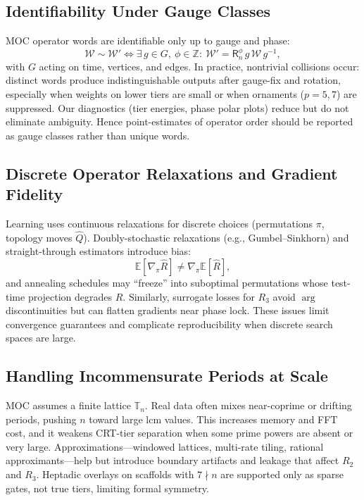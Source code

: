\documentclass[12pt]{article}
\numberwithin{equation}{section}
\theoremstyle{plain}
\theoremstyle{definition}
\theoremstyle{remark}
\begin{document}
\subsection*{Identifiability Under Gauge Classes}
MOC operator words are identifiable only up to gauge and phase:
\[
\mathcal{W}\sim \mathcal{W}' \iff \exists\, g\in G,\ \phi\in\mathbb{Z}:\ 
\mathcal{W}'=\mathsf{R}_n^{\phi}\,g\,\mathcal{W}\,g^{-1},
\]
with $G$ acting on time, vertices, and edges. In practice, nontrivial collisions occur:
distinct words produce indistinguishable outputs after gauge-fix and rotation, especially when weights on lower tiers are small or when ornaments ($p=5,7$) are suppressed. Our diagnostics (tier energies, phase polar plots) reduce but do not eliminate ambiguity. Hence point-estimates of operator order should be reported as gauge classes rather than unique words.

\subsection*{Discrete Operator Relaxations and Gradient Fidelity}
Learning uses continuous relaxations for discrete choices (permutations $\pi$, topology moves $\hat{Q}$). Doubly-stochastic relaxations (e.g., Gumbel–Sinkhorn) and straight-through estimators introduce bias:
\[
\mathbb{E}[\nabla_{\pi} \widehat{R}]\neq \nabla_{\pi} \mathbb{E}[\widehat{R}],
\]
and annealing schedules may “freeze” into suboptimal permutations whose test-time projection degrades $R$. Similarly, surrogate losses for $R_3$ avoid $\arg$ discontinuities but can flatten gradients near phase lock. These issues limit convergence guarantees and complicate reproducibility when discrete search spaces are large.

\subsection*{Handling Incommensurate Periods at Scale}
MOC assumes a finite lattice $\mathbb{T}_n$. Real data often mixes near-coprime or drifting periods, pushing $n$ toward large $\mathrm{lcm}$ values. This increases memory and FFT cost, and it weakens CRT-tier separation when some prime powers are absent or very large. Approximations—windowed lattices, multi-rate tiling, rational approximants—help but introduce boundary artifacts and leakage that affect $R_2$ and $R_3$. Heptadic overlays on scaffolds with $7\nmid n$ are supported only as sparse gates, not true tiers, limiting formal symmetry.
\end{document}

